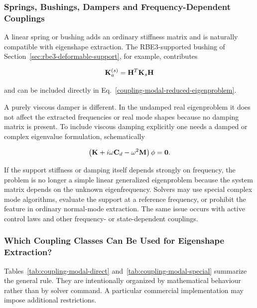 \subsubsection{Springs, Bushings, Dampers and Frequency-Dependent Couplings}

A linear spring or bushing adds an ordinary stiffness matrix and is naturally
compatible with eigenshape extraction. The RBE3-supported bushing of
Section~\ref{sec:rbe3-deformable-support}, for example, contributes

\begin{equation}
    \mathbf{K}_a^{(s)}=\mathbf{H}^{T}\mathbf{K}_s\mathbf{H}
\end{equation}

and can be included directly in Eq.~\eqref{coupling-modal-reduced-eigenproblem}.

A purely viscous damper is different. In the undamped real eigenproblem it does
not affect the extracted frequencies or real mode shapes because no damping
matrix is present. To include viscous damping explicitly one needs a damped or
complex eigenvalue formulation, schematically

\begin{equation}
    \left(
    \mathbf{K}+i\omega\mathbf{C}_d-\omega^2\mathbf{M}
    \right)\mathbf{\phi}=\mathbf{0}.
\end{equation}

If the support stiffness or damping itself depends strongly on frequency, the
problem is no longer a simple linear generalized eigenproblem because the system
matrix depends on the unknown eigenfrequency. Solvers may use special complex
mode algorithms, evaluate the support at a reference frequency, or prohibit the
feature in ordinary normal-mode extraction. The same issue occurs with active
control laws and other frequency- or state-dependent couplings.

\subsubsection{Which Coupling Classes Can Be Used for Eigenshape Extraction?}

Tables~\ref{tab:coupling-modal-direct} and~\ref{tab:coupling-modal-special} summarize the general rule. They are
intentionally organized by mathematical behaviour rather than by solver command.
A particular commercial implementation may impose additional restrictions.

